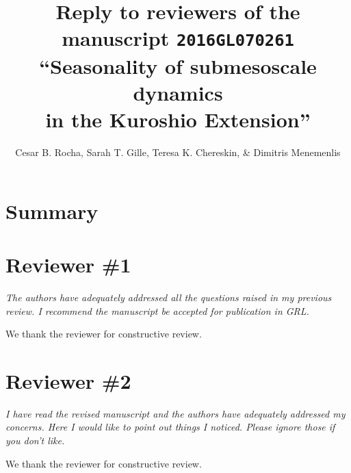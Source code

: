 \documentclass[11pt]{article}
\title{{\normalfont Reply to reviewers of the manuscript \texttt{2016GL070261} }
       ``Seasonality of submesoscale
       dynamics \\in the Kuroshio Extension''}
\author{Cesar B. Rocha,
        Sarah T. Gille, Teresa K. Chereskin, \& Dimitris Menemenlis}
\date{}
\newcommand{\bdp}{\begin{description}}
\newcommand{\edp}{\end{description}}
\begin{document}
%

\maketitle

\section*{Summary}

\section{Reviewer \#1}

{\it The authors have adequately addressed all the questions raised in my
previous review. I recommend the manuscript be accepted for publication in GRL.}

\bdp
  \item We thank the reviewer for constructive review.
\edp

\section{Reviewer \#2}

{\it I have read the revised manuscript and the authors have adequately addressed
     my concerns. Here I would like to point out things I noticed.
     Please ignore those if you don't like.}

\bdp
   \item We thank the reviewer for constructive review.
\edp
\end{document}
